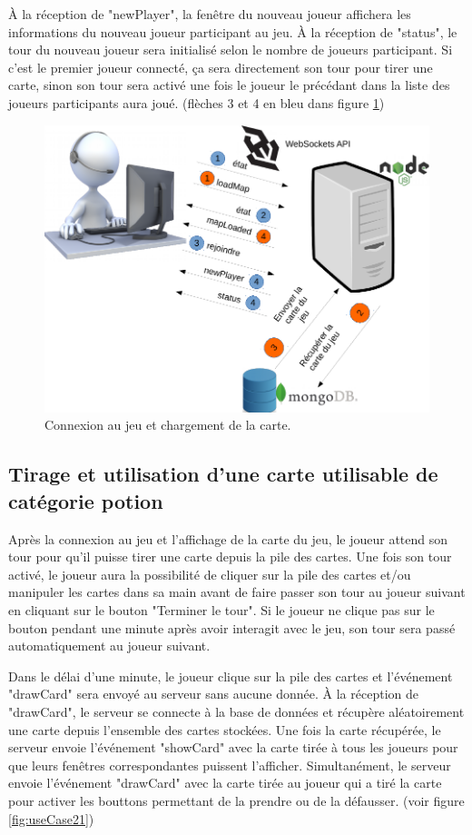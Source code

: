 \documentclass[12pt]{report}
\begin{document}
			À la réception de "newPlayer", la fenêtre du nouveau joueur affichera les informations du nouveau joueur participant au jeu. À la réception de "status", le tour du nouveau joueur sera initialisé selon le nombre de joueurs participant. Si c'est le premier joueur connecté, ça sera directement son tour pour tirer une carte, sinon son tour sera activé une fois le joueur le précédant dans la liste des joueurs participants aura joué. (flèches 3 et 4 en bleu dans figure \ref{fig:useCase1})

			\begin{figure}[h!]
		  	\centering
		    \includegraphics[scale=0.5]{images/useCase1.png}
		    \caption{Connexion au jeu et chargement de la carte.}
				\label{fig:useCase1}
		  \end{figure}

			\subsection{Tirage et utilisation d'une carte utilisable de catégorie potion}
			Après la connexion au jeu et l'affichage de la carte du jeu, le joueur attend son tour pour qu'il puisse tirer une carte depuis la pile des cartes. Une fois son tour activé, le joueur aura la possibilité de cliquer sur la pile des cartes et/ou manipuler les cartes dans sa main avant de faire passer son tour au joueur suivant en cliquant sur le bouton "Terminer le tour". Si le joueur ne clique pas sur le bouton pendant une minute après avoir interagit avec le jeu, son tour sera passé automatiquement au joueur suivant.

			Dans le délai d'une minute, le joueur clique sur la pile des cartes et l'événement "drawCard" sera envoyé au serveur sans aucune donnée. À la réception de "drawCard", le serveur se connecte à la base de données et récupère aléatoirement une carte depuis l'ensemble des cartes stockées. Une fois la carte récupérée, le serveur envoie l'événement "showCard" avec la carte tirée à tous les joueurs pour que leurs fenêtres correspondantes puissent l'afficher. Simultanément, le serveur envoie l'événement "drawCard" avec la carte tirée au joueur qui a tiré la carte pour activer les bouttons permettant de la prendre ou de la défausser. (voir figure \ref{fig:useCase21})
\end{document}
